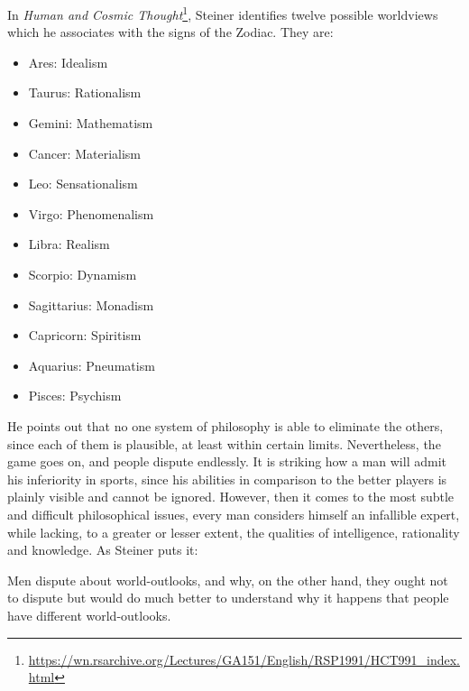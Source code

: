 In \textit{Human and Cosmic Thought}\footnote{\url{https://wn.rsarchive.org/Lectures/GA151/English/RSP1991/HCT991_index.html}}, Steiner identifies twelve possible worldviews which he associates with the signs of the Zodiac. They are:

\begin{itemize}


\item Ares: Idealism

\item Taurus: Rationalism

\item Gemini: Mathematism

\item Cancer: Materialism

\item Leo: Sensationalism

\item Virgo: Phenomenalism

\item Libra: Realism

\item Scorpio: Dynamism

\item Sagittarius: Monadism

\item Capricorn: Spiritism

\item Aquarius: Pneumatism

\item Pisces: Psychism
\end{itemize}


He points out that no one system of philosophy is able to eliminate the others, since each of them is plausible, at least within certain limits. Nevertheless, the game goes on, and people dispute endlessly. It is striking how a man will admit his inferiority in sports, since his abilities in comparison to the better players is plainly visible and cannot be ignored. However, then it comes to the most subtle and difficult philosophical issues, every man considers himself an infallible expert, while lacking, to a greater or lesser extent, the qualities of intelligence, rationality and knowledge. As Steiner puts it:

\begin{quotex}
Men dispute about world-outlooks, and why, on the other hand, they ought not to dispute but would do much better to understand why it happens that people have different world-outlooks.
\end{quotex}


